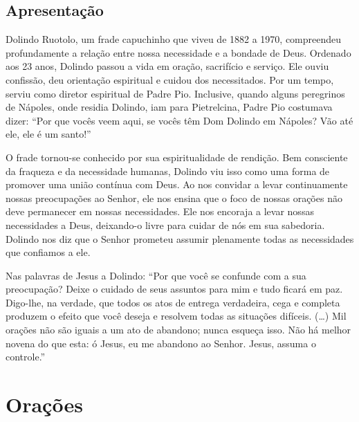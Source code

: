 \documentclass[18pt]{article}
\begin{document}
\begin{justify}

 \begin{center}
  \section{Apresentação}\label{sec:Apresentação} %
 \end{center}


 Dolindo Ruotolo, um frade capuchinho que viveu de 1882 a 1970, compreendeu profundamente a relação entre nossa necessidade e a bondade de Deus. Ordenado aos 23 anos, Dolindo passou a vida em oração, sacrifício e serviço. Ele ouviu confissão, deu orientação espiritual e cuidou dos necessitados. Por um tempo, serviu como diretor espiritual de Padre Pio. Inclusive, quando alguns peregrinos de Nápoles, onde residia Dolindo, iam para Pietrelcina, Padre Pio costumava dizer: “Por que vocês veem aqui, se vocês têm Dom Dolindo em Nápoles? Vão até ele, ele é um santo!”

 O frade tornou-se conhecido por sua espiritualidade de rendição. Bem consciente da fraqueza e da necessidade humanas, Dolindo viu isso como uma forma de promover uma união contínua com Deus. Ao nos convidar a levar continuamente nossas preocupações ao Senhor, ele nos ensina que o foco de nossas orações não deve permanecer em nossas necessidades. Ele nos encoraja a levar nossas necessidades a Deus, deixando-o livre para cuidar de nós em sua sabedoria. Dolindo nos diz que o Senhor prometeu assumir plenamente todas as necessidades que confiamos a ele.

 Nas palavras de Jesus a Dolindo: “Por que você se confunde com a sua preocupação? Deixe o cuidado de seus assuntos para mim e tudo ficará em paz. Digo-lhe, na verdade, que todos os atos de entrega verdadeira, cega e completa produzem o efeito que você deseja e resolvem todas as situações difíceis. (…) Mil orações não são iguais a um ato de abandono; nunca esqueça isso. Não há melhor novena do que esta: ó Jesus, eu me abandono ao Senhor. Jesus, assuma o controle.”

\end{justify}


\newpage
\section{Orações}\label{sec:Orações} %
\end{document}
